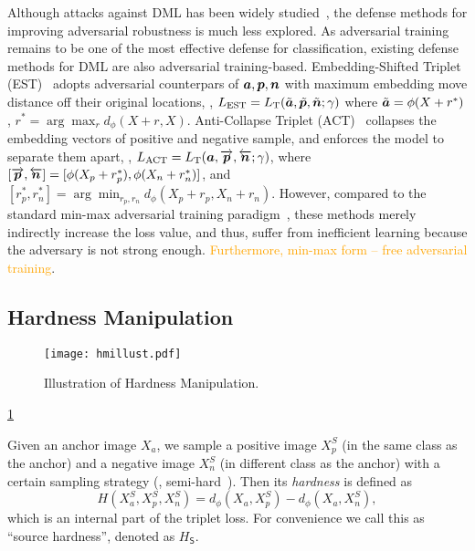 \documentclass[10pt,twocolumn,letterpaper]{article}
\newcommand{\oo}[1]{\textcolor{orange}{#1}}
\begin{document}
Although attacks against DML has been widely studied~\cite{advrank,advorder},
the defense methods for improving adversarial robustness is much less explored.
%
As adversarial training~\cite{madry} remains to be one of the most effective
defense for classification, existing defense methods for DML are also
adversarial training-based.
%
Embedding-Shifted Triplet (EST)~\cite{advrank} adopts adversarial counterpars
of ${\bm{a}},{\bm{p}},{\bm{n}}$ with maximum embedding move distance off their original
locations, \ie,
$L_\text{EST}=L_\text{T}(\tilde{{\bm{a}}},\tilde{{\bm{p}}},\tilde{{\bm{n}}};\gamma)$ where
$\tilde{{\bm{a}}}=\phi(X+r^*)$, $r^*=\arg\max_{r}d_\phi(X+r, X)$.
%
Anti-Collapse Triplet (ACT)~\cite{robrank} collapses the embedding vectors of
positive and negative sample, and enforces the model to separate them apart,
\ie, $L_\text{ACT}=L_\text{T}({\bm{a}}, \overrightarrow{{\bm{p}}},
\overleftarrow{{\bm{n}}};\gamma)$, where $[\overrightarrow{{\bm{p}}},\overleftarrow{{\bm{n}}}]
=[\phi(X_p+r_p^*), \phi(X_n+r_n^*)]$, and $[r_p^*,r_n^*]=\arg\min_{r_p,r_n}
d_\phi(X_p+r_p, X_n+r_n)$.
%
However, compared to the standard min-max adversarial training
paradigm~\cite{madry}, these methods merely indirectly increase the loss value,
and thus, suffer from inefficient learning because the adversary is not strong
enough.
%
\oo{Furthermore, min-max form -- free adversarial training}.

\subsection{Hardness Manipulation}
\label{sec:31}

\begin{figure}
	\texttt{[image: hmillust.pdf]}
	\caption{Illustration of Hardness Manipulation.}
	\label{fig:hm}
\end{figure}

\cref{fig:hm}

Given an anchor image $X_a$, we sample a positive image $X_p^S$ (in the same
class as the anchor) and a negative image $X_n^S$ (in different class as the
anchor) with a certain sampling strategy (\eg, semi-hard~\cite{facenet}).
%
%
Then its \emph{hardness} is defined as
%
\begin{equation}
%
H(X_a^S,X_p^S,X_n^S)=d_\phi(X_a,X_p^S)-d_\phi(X_a,X_n^S),
%
\end{equation}
%
which is an internal
part of the triplet loss.
%
For convenience we call this as ``source hardness'', denoted as $H_\mathsf{S}$.
\end{document}
